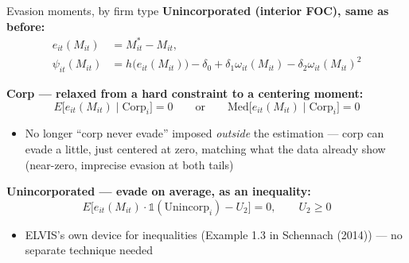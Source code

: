 \documentclass[
  ignorenonframetext,
  aspectratio=169,
]{beamer}
\providecommand{\tightlist}{%
  \setlength{\itemsep}{0pt}\setlength{\parskip}{0pt}}
\begin{document}
\begin{frame}{Evasion moments, by firm type}
\protect{}\label{evasion-moments-by-firm-type}
\textbf{Unincorporated (interior FOC), same as before:} \[
\begin{aligned}
e_{it}(M_{it})&=M^*_{it}-M_{it},\\
\psi_{it}(M_{it})&=h\big(e_{it}(M_{it})\big)-\delta_0+\delta_1\omega_{it}(M_{it})-\delta_2\omega_{it}(M_{it})^2
\end{aligned}
\]

\textbf{Corp --- relaxed from a hard constraint to a centering moment:}
\[
E\big[e_{it}(M_{it})\mid\text{Corp}_i\big]=0 \qquad\text{or}\qquad \text{Med}\big[e_{it}(M_{it})\mid\text{Corp}_i\big]=0
\]

\begin{itemize}
\tightlist
\item
  No longer ``corp never evade'' imposed \emph{outside} the estimation
  --- corp can evade a little, just centered at zero, matching what the
  data already show (near-zero, imprecise evasion at both tails)
\end{itemize}

\textbf{Unincorporated --- evade on average, as an inequality:} \[
E\big[e_{it}(M_{it})\cdot\mathbb 1(\text{Unincorp}_i)-U_2\big]=0,\qquad U_2\ge0
\]

\begin{itemize}
\tightlist
\item
  ELVIS's own device for inequalities (Example 1.3 in Schennach (2014))
  --- no separate technique needed
\end{itemize}
\end{frame}
\end{document}
